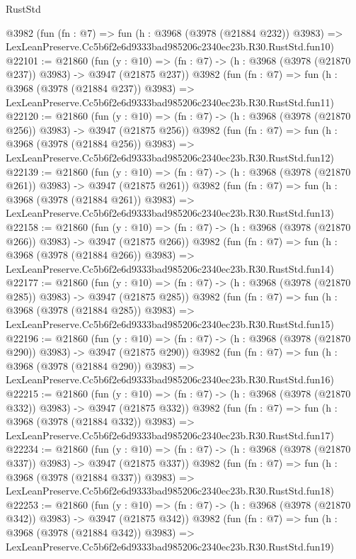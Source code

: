 \begin{lexlean}{RustStd}
\begin{coremodule}
    @3982
    (fun (fn : @7) =>
    fun (h : @3968 (@3978 (@21884 @232)) @3983) =>
    LexLeanPreserve.Cc5b6f2e6d9333bad985206c2340ec23b.R30.RustStd.fun10)
@22101 := @21860
    (fun (y : @10) => (fn : @7) -> (h : @3968 (@3978 (@21870 @237)) @3983) -> @3947 (@21875 @237))
    @3982
    (fun (fn : @7) =>
    fun (h : @3968 (@3978 (@21884 @237)) @3983) =>
    LexLeanPreserve.Cc5b6f2e6d9333bad985206c2340ec23b.R30.RustStd.fun11)
@22120 := @21860
    (fun (y : @10) => (fn : @7) -> (h : @3968 (@3978 (@21870 @256)) @3983) -> @3947 (@21875 @256))
    @3982
    (fun (fn : @7) =>
    fun (h : @3968 (@3978 (@21884 @256)) @3983) =>
    LexLeanPreserve.Cc5b6f2e6d9333bad985206c2340ec23b.R30.RustStd.fun12)
@22139 := @21860
    (fun (y : @10) => (fn : @7) -> (h : @3968 (@3978 (@21870 @261)) @3983) -> @3947 (@21875 @261))
    @3982
    (fun (fn : @7) =>
    fun (h : @3968 (@3978 (@21884 @261)) @3983) =>
    LexLeanPreserve.Cc5b6f2e6d9333bad985206c2340ec23b.R30.RustStd.fun13)
@22158 := @21860
    (fun (y : @10) => (fn : @7) -> (h : @3968 (@3978 (@21870 @266)) @3983) -> @3947 (@21875 @266))
    @3982
    (fun (fn : @7) =>
    fun (h : @3968 (@3978 (@21884 @266)) @3983) =>
    LexLeanPreserve.Cc5b6f2e6d9333bad985206c2340ec23b.R30.RustStd.fun14)
@22177 := @21860
    (fun (y : @10) => (fn : @7) -> (h : @3968 (@3978 (@21870 @285)) @3983) -> @3947 (@21875 @285))
    @3982
    (fun (fn : @7) =>
    fun (h : @3968 (@3978 (@21884 @285)) @3983) =>
    LexLeanPreserve.Cc5b6f2e6d9333bad985206c2340ec23b.R30.RustStd.fun15)
@22196 := @21860
    (fun (y : @10) => (fn : @7) -> (h : @3968 (@3978 (@21870 @290)) @3983) -> @3947 (@21875 @290))
    @3982
    (fun (fn : @7) =>
    fun (h : @3968 (@3978 (@21884 @290)) @3983) =>
    LexLeanPreserve.Cc5b6f2e6d9333bad985206c2340ec23b.R30.RustStd.fun16)
@22215 := @21860
    (fun (y : @10) => (fn : @7) -> (h : @3968 (@3978 (@21870 @332)) @3983) -> @3947 (@21875 @332))
    @3982
    (fun (fn : @7) =>
    fun (h : @3968 (@3978 (@21884 @332)) @3983) =>
    LexLeanPreserve.Cc5b6f2e6d9333bad985206c2340ec23b.R30.RustStd.fun17)
@22234 := @21860
    (fun (y : @10) => (fn : @7) -> (h : @3968 (@3978 (@21870 @337)) @3983) -> @3947 (@21875 @337))
    @3982
    (fun (fn : @7) =>
    fun (h : @3968 (@3978 (@21884 @337)) @3983) =>
    LexLeanPreserve.Cc5b6f2e6d9333bad985206c2340ec23b.R30.RustStd.fun18)
@22253 := @21860
    (fun (y : @10) => (fn : @7) -> (h : @3968 (@3978 (@21870 @342)) @3983) -> @3947 (@21875 @342))
    @3982
    (fun (fn : @7) =>
    fun (h : @3968 (@3978 (@21884 @342)) @3983) =>
    LexLeanPreserve.Cc5b6f2e6d9333bad985206c2340ec23b.R30.RustStd.fun19)

\end{coremodule}
\end{lexlean}
